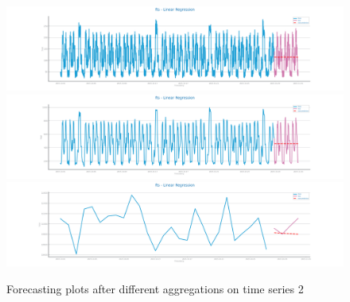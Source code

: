 \documentclass[10pt]{extarticle}
\begin{document}
\begin{figure}[H]
\centering\includegraphics[scale=0.4]{images/dataset2/time_series/fts_linear_regression_forecast_Minutely.png}
\includegraphics[scale=0.4]{images/dataset2/time_series/fts_linear_regression_forecast_Hourly.png}
\includegraphics[scale=0.4]{images/dataset2/time_series/fts_linear_regression_forecast_Daily.png}
\caption{Forecasting plots after different aggregations on time series 2}
\end{figure}
\end{document}
